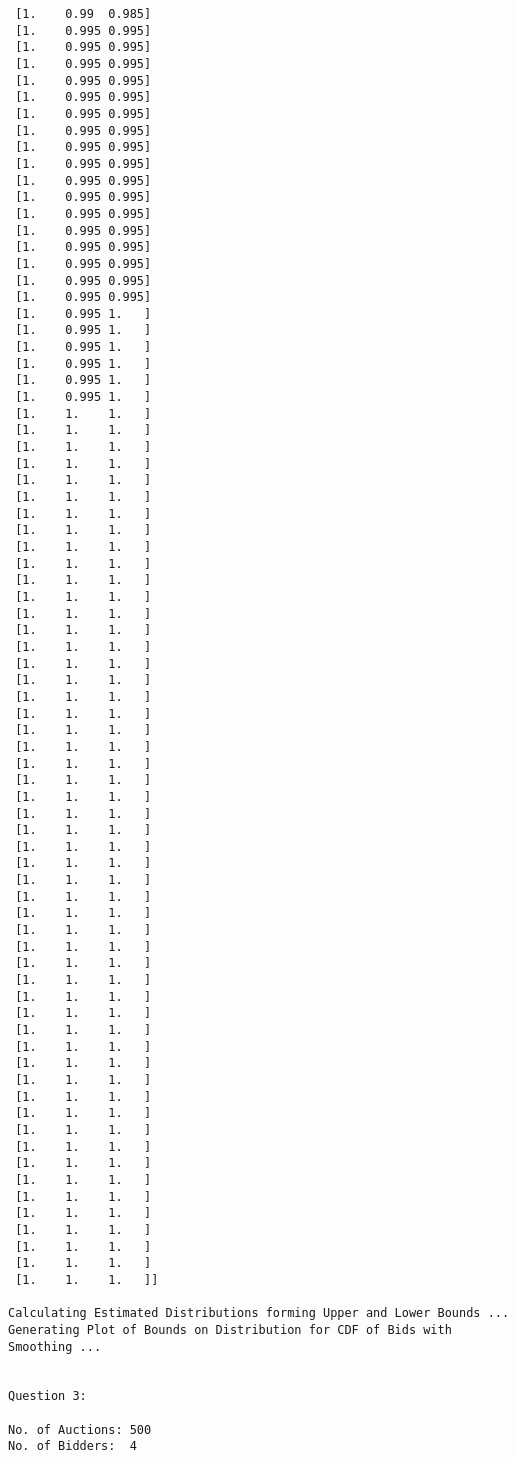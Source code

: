 \documentclass{article}
\begin{document}
\begin{lstlisting}
 [1.    0.99  0.985]
 [1.    0.995 0.995]
 [1.    0.995 0.995]
 [1.    0.995 0.995]
 [1.    0.995 0.995]
 [1.    0.995 0.995]
 [1.    0.995 0.995]
 [1.    0.995 0.995]
 [1.    0.995 0.995]
 [1.    0.995 0.995]
 [1.    0.995 0.995]
 [1.    0.995 0.995]
 [1.    0.995 0.995]
 [1.    0.995 0.995]
 [1.    0.995 0.995]
 [1.    0.995 0.995]
 [1.    0.995 0.995]
 [1.    0.995 0.995]
 [1.    0.995 1.   ]
 [1.    0.995 1.   ]
 [1.    0.995 1.   ]
 [1.    0.995 1.   ]
 [1.    0.995 1.   ]
 [1.    0.995 1.   ]
 [1.    1.    1.   ]
 [1.    1.    1.   ]
 [1.    1.    1.   ]
 [1.    1.    1.   ]
 [1.    1.    1.   ]
 [1.    1.    1.   ]
 [1.    1.    1.   ]
 [1.    1.    1.   ]
 [1.    1.    1.   ]
 [1.    1.    1.   ]
 [1.    1.    1.   ]
 [1.    1.    1.   ]
 [1.    1.    1.   ]
 [1.    1.    1.   ]
 [1.    1.    1.   ]
 [1.    1.    1.   ]
 [1.    1.    1.   ]
 [1.    1.    1.   ]
 [1.    1.    1.   ]
 [1.    1.    1.   ]
 [1.    1.    1.   ]
 [1.    1.    1.   ]
 [1.    1.    1.   ]
 [1.    1.    1.   ]
 [1.    1.    1.   ]
 [1.    1.    1.   ]
 [1.    1.    1.   ]
 [1.    1.    1.   ]
 [1.    1.    1.   ]
 [1.    1.    1.   ]
 [1.    1.    1.   ]
 [1.    1.    1.   ]
 [1.    1.    1.   ]
 [1.    1.    1.   ]
 [1.    1.    1.   ]
 [1.    1.    1.   ]
 [1.    1.    1.   ]
 [1.    1.    1.   ]
 [1.    1.    1.   ]
 [1.    1.    1.   ]
 [1.    1.    1.   ]
 [1.    1.    1.   ]
 [1.    1.    1.   ]
 [1.    1.    1.   ]
 [1.    1.    1.   ]
 [1.    1.    1.   ]
 [1.    1.    1.   ]
 [1.    1.    1.   ]
 [1.    1.    1.   ]
 [1.    1.    1.   ]
 [1.    1.    1.   ]
 [1.    1.    1.   ]
 [1.    1.    1.   ]]

Calculating Estimated Distributions forming Upper and Lower Bounds ...
Generating Plot of Bounds on Distribution for CDF of Bids with Smoothing ...


Question 3:

No. of Auctions: 500
No. of Bidders:  4


\end{lstlisting}
\end{document}
